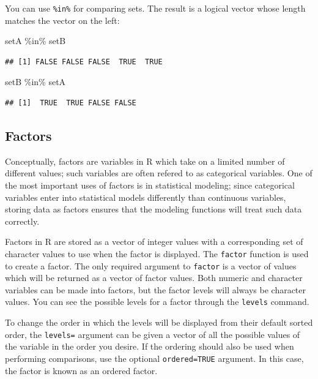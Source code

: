 \documentclass[
]{book}
\newenvironment{Shaded}{\begin{snugshade}}{\end{snugshade}}
\newcommand{\NormalTok}[1]{#1}
\newcommand{\SpecialCharTok}[1]{\textcolor[rgb]{0.00,0.00,0.00}{#1}}
\theoremstyle{definition}
\theoremstyle{definition}
\theoremstyle{definition}
\theoremstyle{definition}
\theoremstyle{remark}
\begin{document}
You can use \texttt{\%in\%} for comparing sets. The result is a logical vector whose length matches the vector on the left:

\begin{Shaded}
\begin{Highlighting}[]
\NormalTok{setA }\SpecialCharTok{\%in\%}\NormalTok{ setB}
\end{Highlighting}
\end{Shaded}

\begin{verbatim}
## [1] FALSE FALSE FALSE  TRUE  TRUE
\end{verbatim}

\begin{Shaded}
\begin{Highlighting}[]
\NormalTok{setB }\SpecialCharTok{\%in\%}\NormalTok{ setA}
\end{Highlighting}
\end{Shaded}

\begin{verbatim}
## [1]  TRUE  TRUE FALSE FALSE
\end{verbatim}

\hypertarget{factors}{%
\subsection{Factors}\label{factors}}

Conceptually, factors are variables in R which take on a limited number of different values; such variables are often refered to as categorical variables. One of the most important uses of factors is in statistical modeling; since categorical variables enter into statistical models differently than continuous variables, storing data as factors ensures that the modeling functions will treat such data correctly.

Factors in R are stored as a vector of integer values with a corresponding set of character values to use when the factor is displayed. The \texttt{factor} function is used to create a factor. The only required argument to \texttt{factor} is a vector of values which will be returned as a vector of factor values. Both numeric and character variables can be made into factors, but the factor levels will always be character values. You can see the possible levels for a factor through the \texttt{levels} command.

To change the order in which the levels will be displayed from their default sorted order, the \texttt{levels=} argument can be given a vector of all the possible values of the variable in the order you desire. If the ordering should also be used when performing comparisons, use the optional \texttt{ordered=TRUE} argument. In this case, the factor is known as an ordered factor.
\end{document}
